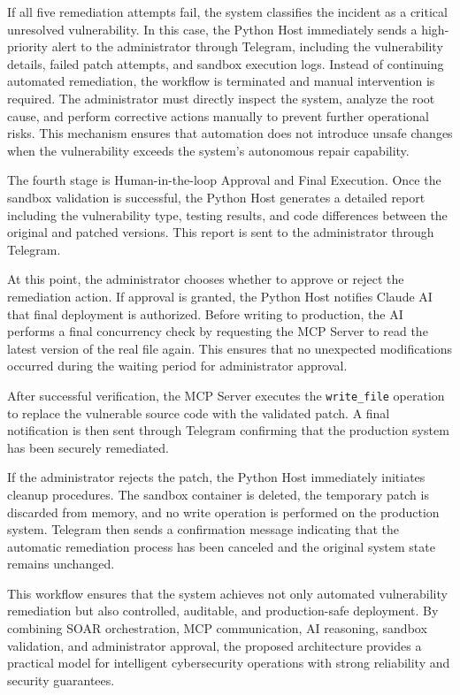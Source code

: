 \documentclass[12pt]{report}
\begin{document}
If all five remediation attempts fail, the system classifies the incident as a critical unresolved vulnerability. In this case, the Python Host immediately sends a high-priority alert to the administrator through Telegram, including the vulnerability details, failed patch attempts, and sandbox execution logs. Instead of continuing automated remediation, the workflow is terminated and manual intervention is required. The administrator must directly inspect the system, analyze the root cause, and perform corrective actions manually to prevent further operational risks. This mechanism ensures that automation does not introduce unsafe changes when the vulnerability exceeds the system’s autonomous repair capability.

The fourth stage is Human-in-the-loop Approval and Final Execution. Once the sandbox validation is successful, the Python Host generates a detailed report including the vulnerability type, testing results, and code differences between the original and patched versions. This report is sent to the administrator through Telegram.

At this point, the administrator chooses whether to approve or reject the remediation action. If approval is granted, the Python Host notifies Claude AI that final deployment is authorized. Before writing to production, the AI performs a final concurrency check by requesting the MCP Server to read the latest version of the real file again. This ensures that no unexpected modifications occurred during the waiting period for administrator approval.

After successful verification, the MCP Server executes the \texttt{write\_file} operation to replace the vulnerable source code with the validated patch. A final notification is then sent through Telegram confirming that the production system has been securely remediated.

If the administrator rejects the patch, the Python Host immediately initiates cleanup procedures. The sandbox container is deleted, the temporary patch is discarded from memory, and no write operation is performed on the production system. Telegram then sends a confirmation message indicating that the automatic remediation process has been canceled and the original system state remains unchanged.

This workflow ensures that the system achieves not only automated vulnerability remediation but also controlled, auditable, and production-safe deployment. By combining SOAR orchestration, MCP communication, AI reasoning, sandbox validation, and administrator approval, the proposed architecture provides a practical model for intelligent cybersecurity operations with strong reliability and security guarantees.
\end{document}

